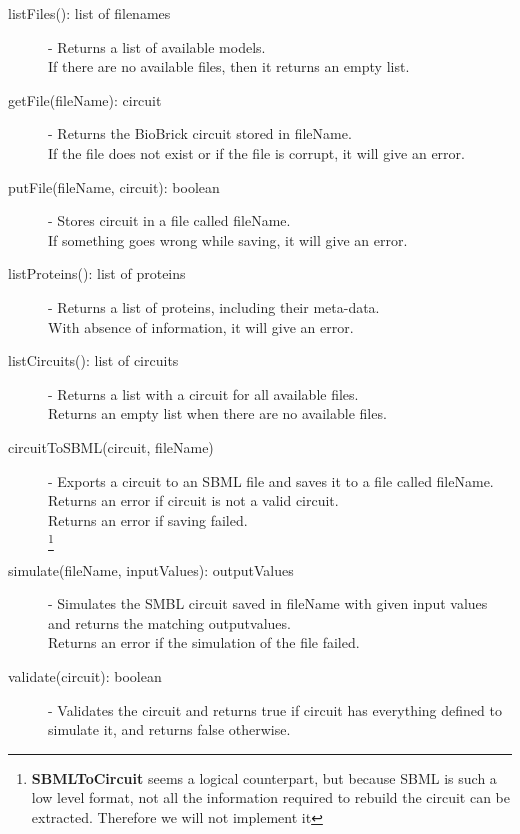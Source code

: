 \documentclass[a4paper]{article}
\begin{document}
\begin{description}
        \item[listFiles(): list of filenames] -
                Returns a list of available models.\\
                If there are no available files, then it returns an empty list.
        \item[getFile(fileName): circuit] -
                Returns the BioBrick circuit stored in fileName.\\
                If the file does not exist or if the file is corrupt, it will give an error.
        \item[putFile(fileName, circuit): boolean] -
                Stores circuit in a file called fileName.\\
                If something goes wrong while saving, it will give an error.
        \item[listProteins(): list of proteins] -
                Returns a list of proteins, including their meta-data.\\
                With absence of information, it will give an error.
        \item[listCircuits(): list of circuits] -
                Returns a list with a circuit for all available files.\\
                Returns an empty list when there are no available files.
        \item[circuitToSBML(circuit, fileName)] -
                Exports a circuit to an SBML file and saves it to a file called fileName.\\
                Returns an error if circuit is not a valid circuit.\\
                Returns an error if saving failed. \\
        \footnote{\textbf{SBMLToCircuit} seems a logical counterpart, but because SBML is such a low level format, not all the information required to rebuild the circuit can be extracted. Therefore we will not implement it}
        \item[simulate(fileName, inputValues): outputValues] -
                Simulates the SMBL circuit saved in fileName with given input values and returns the matching outputvalues.\\
                Returns an error if the simulation of the file failed.
        \item[validate(circuit): boolean] -
                Validates the circuit and returns true if circuit has everything defined to simulate it, and returns false otherwise.\\
\end{description}
\end{document}
